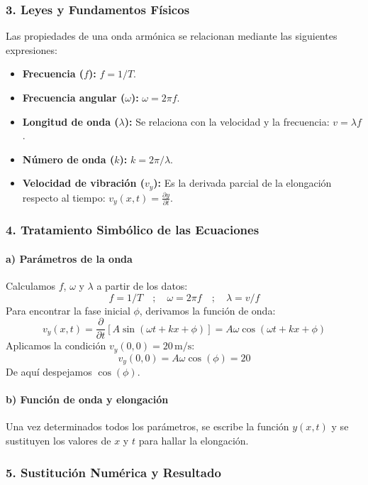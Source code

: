 \subsubsection*{3. Leyes y Fundamentos Físicos}
Las propiedades de una onda armónica se relacionan mediante las siguientes expresiones:
\begin{itemize}
    \item \textbf{Frecuencia ($f$):} $f=1/T$.
    \item \textbf{Frecuencia angular ($\omega$):} $\omega=2\pi f$.
    \item \textbf{Longitud de onda ($\lambda$):} Se relaciona con la velocidad y la frecuencia: $v=\lambda f$.
    \item \textbf{Número de onda ($k$):} $k=2\pi/\lambda$.
    \item \textbf{Velocidad de vibración ($v_y$):} Es la derivada parcial de la elongación respecto al tiempo: $v_y(x,t) = \frac{\partial y}{\partial t}$.
\end{itemize}

\subsubsection*{4. Tratamiento Simbólico de las Ecuaciones}
\paragraph*{a) Parámetros de la onda}
Calculamos $f$, $\omega$ y $\lambda$ a partir de los datos:
$$ f = 1/T \quad ; \quad \omega = 2\pi f \quad ; \quad \lambda = v/f $$
Para encontrar la fase inicial $\phi$, derivamos la función de onda:
$$ v_y(x,t) = \frac{\partial}{\partial t}[A\sin(\omega t+kx+\phi)] = A\omega\cos(\omega t+kx+\phi) $$
Aplicamos la condición $v_y(0,0)=20\,\text{m/s}$:
$$ v_y(0,0) = A\omega\cos(\phi) = 20 $$
De aquí despejamos $\cos(\phi)$.

\paragraph*{b) Función de onda y elongación}
Una vez determinados todos los parámetros, se escribe la función $y(x,t)$ y se sustituyen los valores de $x$ y $t$ para hallar la elongación.

\subsubsection*{5. Sustitución Numérica y Resultado}
